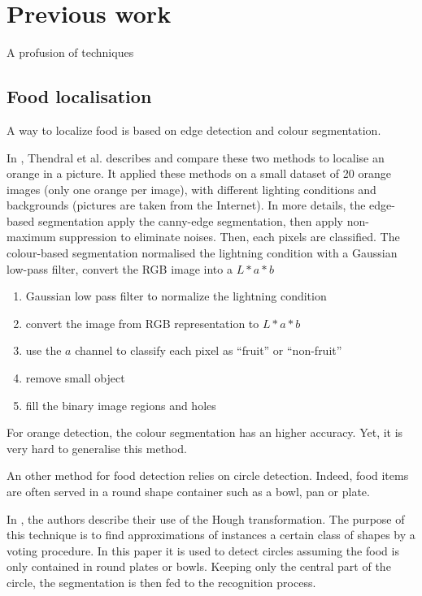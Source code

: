 \chapter{Previous work} \label{sec:previous_work}

A profusion of techniques 

\section{Food localisation}


A way to localize food is based on edge detection and colour segmentation.

In \cite{Thendral2014a}, Thendral et al. describes and compare these two methods to localise an orange in a picture. It applied these methods on a small dataset of 20 orange images (only one orange per image), with different lighting conditions and backgrounds (pictures are taken from the Internet).
In more details, the edge-based segmentation apply the canny-edge segmentation, then apply non-maximum suppression to eliminate noises. Then, each pixels are classified.
The colour-based segmentation normalised the lightning condition with a Gaussian low-pass filter, convert the RGB image into a $L * a * b$
\begin{enumerate}
    \item Gaussian low pass filter to normalize the lightning condition
    \item convert the image from RGB representation to $L * a * b$
    \item use the $a$ channel to classify each pixel as \enquote{fruit} or \enquote{non-fruit}
    \item remove small object
    \item fill the binary image regions and holes
\end{enumerate}
For orange detection, the colour segmentation has an higher accuracy. Yet, it is very hard to generalise this method.


An other method for food detection relies on circle detection. Indeed, food items are often served in a round shape container such as a bowl, pan or plate.

In \cite{Wazumi2011}, the authors describe their use of the Hough transformation. The purpose of this technique is to find approximations of instances a certain class of shapes by a voting procedure.
In this paper it is used to detect circles assuming the food is only contained in round plates or bowls. Keeping only the central part of the circle, the segmentation is then fed to the recognition process.

